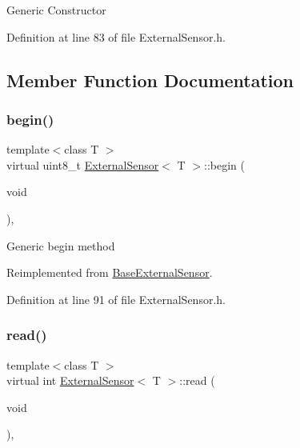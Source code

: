 Generic Constructor 

Definition at line 83 of file External\+Sensor.\+h.



\subsection{Member Function Documentation}
\mbox{\label{class_external_sensor_ab6fe1379d55b656a048e0fba1e0a32e6}} 
\subsubsection{\texorpdfstring{begin()}{begin()}}
{\footnotesize\ttfamily template$<$class T $>$ \\
virtual uint8\+\_\+t \hyperlink{class_external_sensor}{External\+Sensor}$<$ T $>$\+::begin (\begin{DoxyParamCaption}\item[{void}]{ }\end{DoxyParamCaption})\hspace{0.3cm}{\ttfamily [inline]}, {\ttfamily [virtual]}}

Generic begin method 

Reimplemented from \hyperlink{class_base_external_sensor_a87d132803d4f4fdd4e66332809f0c9a0}{Base\+External\+Sensor}.



Definition at line 91 of file External\+Sensor.\+h.

\mbox{\label{class_external_sensor_a6dbf2d6b1c183740ce0f153d6e43ccb2}} 
\subsubsection{\texorpdfstring{read()}{read()}}
{\footnotesize\ttfamily template$<$class T $>$ \\
virtual int \hyperlink{class_external_sensor}{External\+Sensor}$<$ T $>$\+::read (\begin{DoxyParamCaption}\item[{void}]{ }\end{DoxyParamCaption})\hspace{0.3cm}{\ttfamily [inline]}, {\ttfamily [virtual]}}

